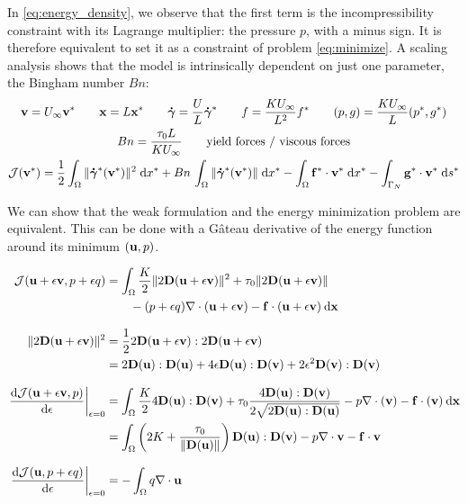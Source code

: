 \documentclass[11 pt]{report}
\begin{document}
In \cref{eq:energy_density}, we observe that the first term is the incompressibility constraint with its Lagrange multiplier: the pressure $p$, with a minus sign. It is therefore equivalent to set it as a constraint of problem \eqref{eq:minimize}. A scaling analysis shows that the model is intrinsically dependent on just one parameter, the Bingham number $Bn$:
    \begin{gather}
        \mathbf{v} = U_{\infty}\mathbf{v}^* \qquad \mathbf{x} = L \mathbf{x}^* \qquad \boldsymbol{\dot \gamma} = \frac{U}{L} \boldsymbol{\dot \gamma}^* \qquad f = \frac{K U_{\infty}}{L^2}f^* \qquad (p,g) = \frac{K U_{\infty}}{L}(p^*,g^*)\\
        Bn = \frac{\tau_0 L}{K U_{\infty}} \qquad \text{yield forces / viscous forces}\\
        \mathcal{J}(\mathbf{v}^*) = \frac{1}{2}\int_{\Omega} \|\boldsymbol{\dot \gamma}^*(\mathbf{v}^*)\|^2 \;\dd x^* + Bn \, \int_{\Omega} \|\boldsymbol{\dot \gamma}^*(\mathbf{v}^*)\| \;\dd x^* - \int_{\Omega} \mathbf{f}^*\cdot \mathbf{v}^* \; \dd x^* - \int_{\Gamma_N} \mathbf{g^*} \cdot \mathbf{v}^* \;\dd s^*
    \end{gather}

We can show that the weak formulation and the energy minimization problem are equivalent. This can be done with a Gâteau derivative of the energy function around its minimum $(\mathbf{u}, p)$.

\begin{align}
    \mathcal{J}(\mathbf{u} + \epsilon \mathbf{v}, p+\epsilon q) &= \int_{\Omega} \frac{K}{2} \|2\mathbf{D}(\mathbf{u} + \epsilon \mathbf{v})\|^2 + \tau_0  \|2\mathbf{D}(\mathbf{u} + \epsilon \mathbf{v})\| \\
    &\qquad - (p + \epsilon q) \nabla \cdot (\mathbf{u} + \epsilon \mathbf{v}) - \mathbf{f}\cdot(\mathbf{u} + \epsilon \mathbf{v}) \: \dd \mathbf{x}\\[8pt]
    \|2\mathbf{D}(\mathbf{u} + \epsilon \mathbf{v})\|^2 &= \frac{1}{2} 2\mathbf{D}(\mathbf{u} + \epsilon \mathbf{v}) : 2\mathbf{D}(\mathbf{u} + \epsilon \mathbf{v}) \nonumber \\
    &= 2 \mathbf{D}(\mathbf{u}):\mathbf{D}(\mathbf{u}) + 4\epsilon \mathbf{D}(\mathbf{u}):\mathbf{D}(\mathbf{v}) + 2\epsilon^2 \mathbf{D}(\mathbf{v}):\mathbf{D}(\mathbf{v})\\[8pt]
    \left. \dv{\mathcal{J}(\mathbf{u}+ \epsilon \mathbf{v}, p)}{\epsilon}\right\vert_{\epsilon=0} &= \int_{\Omega} \frac{K}{2}   4\mathbf{D}(\mathbf{u}):\mathbf{D}(\mathbf{v}) + \tau_0 \frac{4\mathbf{D}(\mathbf{u}):\mathbf{D}(\mathbf{v})}{2\sqrt{2\mathbf{D}(\mathbf{u}):\mathbf{D}(\mathbf{u})}} - p\nabla\cdot(\mathbf{v}) - \mathbf{f}\cdot(\mathbf{v}) \: \dd \mathbf{x}\nonumber\\
    &= \int_{\Omega} \left(2K + \frac{\tau_0}{\|\mathbf{D}(\mathbf{u})\|}\right) \mathbf{D}(\mathbf{u}):\mathbf{D}(\mathbf{v}) - p\nabla\cdot \mathbf{v} - \mathbf{f} \cdot \mathbf{v} \label{eq:gateau_1} \\[8pt]
    \left. \dv{\mathcal{J}(\mathbf{u}, p+\epsilon q)}{\epsilon}\right\vert_{\epsilon=0} &= -\int_{\Omega}q \nabla \cdot \mathbf{u}  \label{eq:gateau_2}
\end{align}
\end{document}
